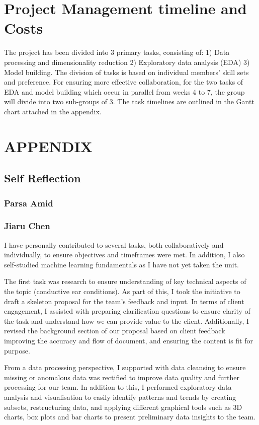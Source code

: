 \documentclass[11pt,a4paper]{article}
\begin{document}
\section*{Project Management timeline and Costs}
The project has been divided into 3 primary tasks, consisting of: 1) Data processing and dimensionality reduction 2) Exploratory data analysis (EDA) 3) Model building. The division of tasks is based on individual members’ skill sets and preference. For ensuring more effective collaboration, for the two tasks of EDA and model building which occur in parallel from weeks 4 to 7, the group will divide into two sub-groups of 3. The task timelines are outlined in the Gantt chart attached in the appendix. 
\section*{APPENDIX}
\subsection*{Self Reflection}
\subsubsection*{Parsa Amid}
\subsubsection*{Jiaru Chen}
I have personally contributed to several tasks, both collaboratively and individually, to ensure objectives and timeframes were met. In addition, I also self-studied machine learning fundamentals as I have not yet taken the unit. 

 

 The first task was research to ensure understanding of key technical aspects of the topic (conductive ear conditions). As part of this, I took the initiative to draft a skeleton proposal for the team’s feedback and input. In terms of client engagement, I assisted with preparing clarification questions to ensure clarity of the task and understand how we can provide value to the client. Additionally, I revised the background section of our proposal based on client feedback improving the accuracy and flow of document, and ensuring the content is fit for purpose. 

 

From a data processing perspective, I supported with data cleansing to ensure missing or anomalous data was rectified to improve data quality and further processing for our team. In addition to this, I performed exploratory data analysis and visualisation to easily identify patterns and trends by creating subsets, restructuring data, and applying different graphical tools such as 3D charts, box plots and bar charts to present preliminary data insights to the team. 
\end{document}
